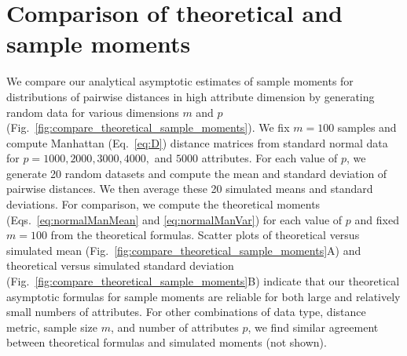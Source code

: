 \documentclass[aos]{imsart}
\begin{document}
\section{Comparison of theoretical and sample moments}

We compare our analytical asymptotic estimates of sample moments for distributions of pairwise distances in high attribute dimension by generating random data for various dimensions $m$ and $p$ (Fig.~\ref{fig:compare_theoretical_sample_moments}). We fix $m=100$ samples and compute Manhattan (Eq.~\ref{eq:D}) distance matrices from standard normal data for $p=1000,2000,3000,4000,$ and $5000$ attributes. For each value of $p$, we generate 20 random datasets and compute the mean and standard deviation of pairwise distances. We then average these 20 simulated means and standard deviations. For comparison, we compute the theoretical moments (Eqs.~\ref{eq:normalManMean} and \ref{eq:normalManVar}) for each value of $p$ and fixed $m=100$ from the theoretical formulas. Scatter plots of theoretical versus simulated mean (Fig.~\ref{fig:compare_theoretical_sample_moments}A) and theoretical versus simulated standard deviation (Fig.~\ref{fig:compare_theoretical_sample_moments}B) indicate that our theoretical asymptotic formulas for sample moments are reliable for both large and relatively small numbers of attributes. For other combinations of data type, distance metric, sample size $m$, and number of attributes $p$, we find similar agreement between theoretical formulas and simulated moments (not shown).
\end{document}
